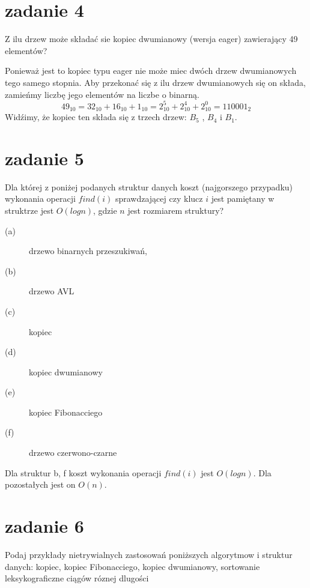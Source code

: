 \documentclass[svgnames]{report}
\begin{document}

\section{zadanie 4}
\begin{framed}
Z ilu drzew może składać sie kopiec dwumianowy (wersja eager) zawierający 49 elementów?
\end{framed}
Ponieważ jest to kopiec typu eager nie może miec dwóch drzew dwumianowych tego samego stopnia.
Aby przekonać się z ilu drzew dwumianowych się on składa, zamieńmy liczbę jego elementów na liczbe o binarną.
\begin{equation}
49_{10} = 32_{10} + 16_{10} + 1_{10} = 2_{10}^5 + 2_{10}^4 + 2_{10}^0 = 110001_2
\end{equation} 
Widźimy, że kopiec ten składa się z trzech drzew: $B_5$ , $B_4$ i $B_1$.


\section{zadanie 5}
\begin{framed}
Dla której z poniżej podanych struktur danych koszt (najgorszego przypadku) wykonania operacji $find(i)$ sprawdzającej czy klucz $i$ jest pamiętany w struktrze jest $O(log n)$, gdzie $n$ jest rozmiarem struktury?
\begin{description}
	\item[(a)] drzewo binarnych przeszukiwań,
	\item[(b)] drzewo AVL
	\item[(c)] kopiec
	\item[(d)] kopiec dwumianowy
	\item[(e)] kopiec Fibonacciego
	\item[(f)] drzewo czerwono-czarne
\end{description}
\end{framed}
Dla struktur b, f koszt wykonania operacji $find(i)$ jest $O(log n)$.
Dla pozostałych jest on $O(n)$.


\section{zadanie 6}
\begin{framed}
Podaj przykłady nietrywialnych zastosowań poniższych algorytmow i struktur danych:
kopiec, kopiec Fibonacciego, kopiec dwumianowy, sortowanie leksykograficzne ciągów róznej dlugości
\end{framed}
\end{document}
